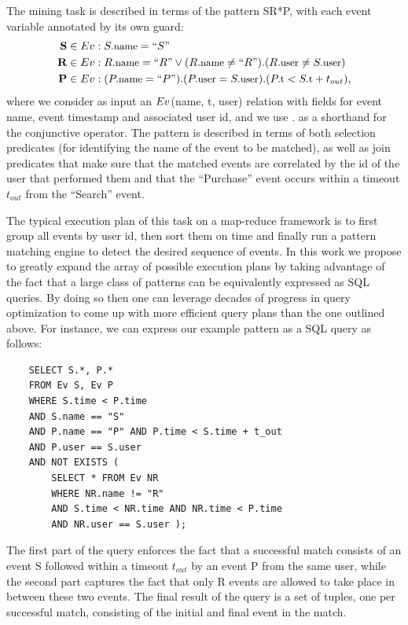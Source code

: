 The mining task is described in terms of the pattern SR*P, with each event 
variable annotated by its own guard:
\begin{align*}
\text{{\bf S}} \in \Ev&: \facc{S}{name} = ``S"
\\
\text{{\bf R}} \in \Ev&: 
\facc{R}{name} = ``R"
\vee
(\facc{R}{name} \neq ``R") . 
(\facc{R}{user} \neq \facc{S}{user})
\\
\text{{\bf P}} \in \Ev&: (\facc{P}{name} = ``P") . 
(\facc{P}{user} = \facc{S}{user}) . 
(\facc{P}{t} < \facc{S}{t} + t_{out}),
\end{align*}
where we consider as input an $Ev$(name, t, user) relation with fields for 
event name, event timestamp and associated user id, and we use $.$ as a 
shorthand for the conjunctive operator. 
The pattern is described in terms of both selection predicates (for identifying 
the name of the event to be matched), as well as join predicates that make sure 
that the matched events are correlated by the id of the user that performed 
them and that the ``Purchase'' event occurs within a timeout $t_{out}$ from the 
``Search'' event. 

The typical execution plan of this task on a map-reduce framework is to first
group all events by user id, then sort them on time and finally run a pattern
matching engine to detect the desired sequence of events.
In this work we propose to greatly expand the array of possible execution plans
by taking advantage of the fact that a large class of patterns can be
equivalently expressed as SQL queries.
By doing so then one can leverage decades of progress in query optimization to
come up with more efficient query plans than the one outlined above.
For instance, we can express our example pattern as a SQL query as follows:
{\small
	\begin{verbatim}
	SELECT S.*, P.*
	FROM Ev S, Ev P
	WHERE S.time < P.time
	AND S.name == "S"   
	AND P.name == "P" AND P.time < S.time + t_out
	AND P.user == S.user
	AND NOT EXISTS ( 
	    SELECT * FROM Ev NR
	    WHERE NR.name != "R"
	    AND S.time < NR.time AND NR.time < P.time
	    AND NR.user == S.user ); 
	\end{verbatim}
}

The first part of the query enforces the fact that a successful match consists
of an event S followed within a timeout $t_{out}$ by an event P from the same 
user,
while the second part captures the fact that only R events are allowed to take
place in between these two events.
The final result of the query is a set of tuples, one per successful match,
consisting of the initial and final event in the match.

